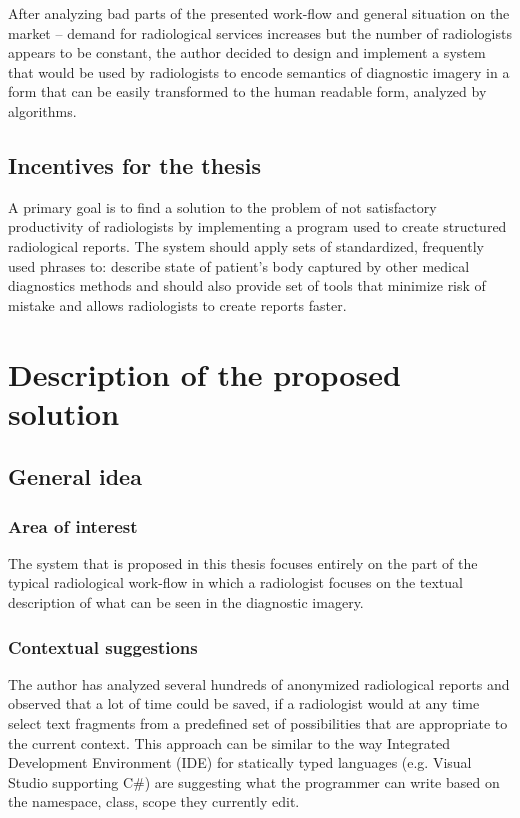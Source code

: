 \documentclass[12pt, twoside, openany]{report}
\theoremstyle{definition}
\begin{document}
After analyzing bad parts of the presented work-flow and general situation on the market -- demand for radiological services increases but the number of radiologists appears to be constant, the author decided to design and implement a system that would be used by radiologists to encode semantics of diagnostic imagery in a form that can be easily transformed to the human readable form, analyzed by algorithms. 

\section{Incentives for the thesis}
A primary goal is to find a solution to the problem of not satisfactory productivity of radiologists by implementing a program used to create structured radiological reports. The system should apply sets of standardized, frequently used phrases to: describe state of patient's body captured by other medical diagnostics methods and should also provide set of tools that minimize risk of mistake and allows radiologists to create reports faster. 



\chapter{Description of the proposed solution}
\section{General idea}
\subsection{Area of interest}
The system that is proposed in this thesis focuses entirely on the part of the typical radiological work-flow in which a radiologist focuses on the textual description of what can be seen in the diagnostic imagery.
\subsection{Contextual suggestions}
The author has analyzed several hundreds of anonymized radiological reports and observed that a lot of time could be saved, if a radiologist would at any time select text fragments from a predefined set of possibilities that are appropriate to the current context. This approach can be similar to the way Integrated Development Environment (IDE) for statically typed languages (e.g. Visual Studio supporting C\#) are suggesting what the programmer can write based on the namespace, class, scope they currently edit.
\end{document}

